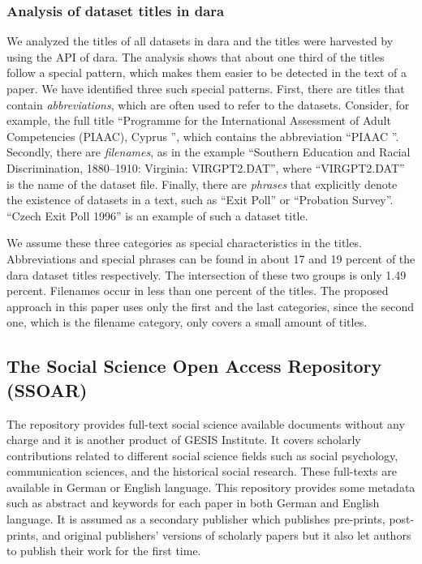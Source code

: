 \documentclass{IOS-Book-Article}
\newcommand{\dara}{\textsf{da\textbar ra}}
\begin{document}
  \subsubsection{Analysis of dataset titles in {\dara}}
We analyzed the titles of all datasets in {\dara} and the titles were harvested by using the API of {\dara}. The analysis shows that about one third of the titles follow a special pattern, which makes them easier to be detected in the text of a paper. We have identified three such special patterns. First, there are titles that contain \emph{abbreviations}, which are often used to refer to the datasets. 
Consider, for example, the full title \enquote{Programme for the International Assessment of Adult Competencies (PIAAC), Cyprus }, which contains the abbreviation \enquote{PIAAC }. Secondly, there are \emph{filenames}, as in the example \enquote{Southern Education and Racial Discrimination, 1880--1910: Virginia: VIRGPT2.DAT}, where \enquote{VIRGPT2.DAT} is the name of the dataset file. Finally, there are \emph{phrases} that explicitly denote the existence of datasets in a text, such as \enquote{Exit Poll} or \enquote{Probation Survey}. \enquote{Czech Exit Poll 1996} is an example of such a dataset title. 

We assume these three categories as special characteristics in the titles. Abbreviations and special phrases can be found in about 17 and 19 percent of the {\dara} dataset titles respectively. The intersection of these two groups is only 1.49 percent. Filenames occur in less than one percent of the titles. The proposed approach in this paper uses only the first and the last categories, since the second one, which is the filename category, only covers a small amount of titles.  

\subsection{The Social Science Open Access Repository (SSOAR)}
The repository provides full-text social science available documents without any charge and it is another product of GESIS Institute. It covers scholarly contributions related to different social science fields such as social psychology, communication sciences, and the historical social research. These full-texts are available in German or English language.
This repository provides some metadata such as abstract and keywords for each paper in both German and English language. It is assumed as a secondary publisher which publishes pre-prints, post-prints, and original publishers' versions of scholarly papers but it also let authors to publish their work for the first time.
\end{document}
